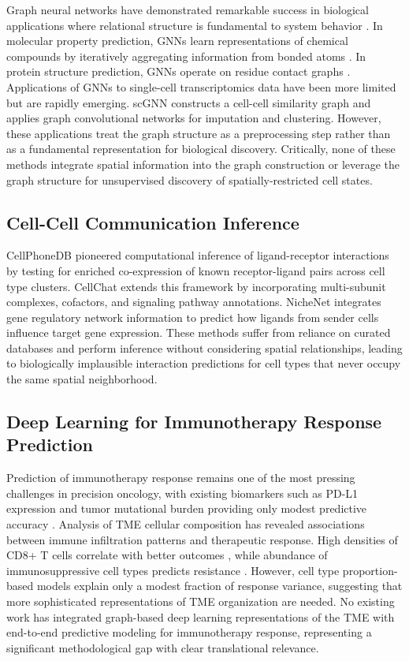 \documentclass{article}
\begin{document}
Graph neural networks have demonstrated remarkable success in biological applications where relational structure is fundamental to system behavior \citep{zhou2020graph}. In molecular property prediction, GNNs learn representations of chemical compounds by iteratively aggregating information from bonded atoms \citep{gilmer2017neural}. In protein structure prediction, GNNs operate on residue contact graphs \citep{ingraham2019generative}. Applications of GNNs to single-cell transcriptomics data have been more limited but are rapidly emerging. scGNN \citep{wang2021scgnn} constructs a cell-cell similarity graph and applies graph convolutional networks for imputation and clustering. However, these applications treat the graph structure as a preprocessing step rather than as a fundamental representation for biological discovery. Critically, none of these methods integrate spatial information into the graph construction or leverage the graph structure for unsupervised discovery of spatially-restricted cell states.

\subsection{Cell-Cell Communication Inference}

CellPhoneDB \citep{efremova2020cellphonedb} pioneered computational inference of ligand-receptor interactions by testing for enriched co-expression of known receptor-ligand pairs across cell type clusters. CellChat \citep{jin2021inference} extends this framework by incorporating multi-subunit complexes, cofactors, and signaling pathway annotations. NicheNet \citep{browaeys2020nichenet} integrates gene regulatory network information to predict how ligands from sender cells influence target gene expression. These methods suffer from reliance on curated databases and perform inference without considering spatial relationships, leading to biologically implausible interaction predictions for cell types that never occupy the same spatial neighborhood.

\subsection{Deep Learning for Immunotherapy Response Prediction}

Prediction of immunotherapy response remains one of the most pressing challenges in precision oncology, with existing biomarkers such as PD-L1 expression and tumor mutational burden providing only modest predictive accuracy \citep{jardim2021role}. Analysis of TME cellular composition has revealed associations between immune infiltration patterns and therapeutic response. High densities of CD8+ T cells correlate with better outcomes \citep{tumeh2014pd}, while abundance of immunosuppressive cell types predicts resistance \citep{cassetta2018targeting}. However, cell type proportion-based models explain only a modest fraction of response variance, suggesting that more sophisticated representations of TME organization are needed. No existing work has integrated graph-based deep learning representations of the TME with end-to-end predictive modeling for immunotherapy response, representing a significant methodological gap with clear translational relevance.
\end{document}
